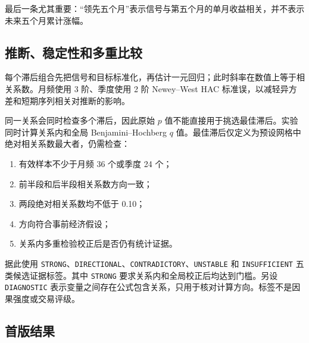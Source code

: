 \documentclass[11pt,a4paper]{ctexart}
\begin{document}
最后一条尤其重要：“领先五个月”表示信号与第五个月的单月收益相关，并不表示未来五个月累计涨幅。

\subsection{推断、稳定性和多重比较}

每个滞后组合先把信号和目标标准化，再估计一元回归；此时斜率在数值上等于相关系数。月频使用 3 阶、季度使用 2 阶 Newey--West HAC 标准误，以减轻异方差和短期序列相关对推断的影响。

同一关系会同时检查多个滞后，因此原始 $p$ 值不能直接用于挑选最佳滞后。实验同时计算关系内和全局 Benjamini--Hochberg $q$ 值。最佳滞后仅定义为预设网格中绝对相关系数最大者，仍需检查：

\begin{enumerate}
  \item 有效样本不少于月频 36 个或季度 24 个；
  \item 前半段和后半段相关系数方向一致；
  \item 两段绝对相关系数均不低于 0.10；
  \item 方向符合事前经济假设；
  \item 关系内多重检验校正后是否仍有统计证据。
\end{enumerate}

据此使用 \texttt{STRONG}、\texttt{DIRECTIONAL}、\texttt{CONTRADICTORY}、\texttt{UNSTABLE} 和 \texttt{INSUFFICIENT} 五类候选证据标签。其中 \texttt{STRONG} 要求关系内和全局校正后均达到门槛。另设 \texttt{DIAGNOSTIC} 表示变量之间存在公式包含关系，只用于核对计算方向。标签不是因果强度或交易评级。

\subsection{首版结果}
\end{document}
